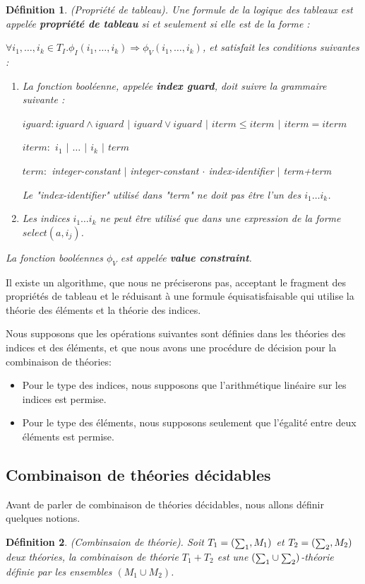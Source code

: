 \documentclass[11pt,openany]{article}
\newcommand\smallsum{\mathsmaller\sum}
\newtheorem{definition}{D\'efinition}[subsection]
\begin{document}
	\begin{definition}
		(Propri\'et\'e de tableau). Une formule de la logique des tableaux est appel\'ee \textbf{propri\'et\'e de tableau} si et seulement si elle est de la forme :
		
$\forall i_{1},\ldots,i_{k}\in T_{I}.\phi_{I}(i_{1},\ldots,i_{k})\Longrightarrow\phi_{V}(i_{1},\ldots,i_{k})$, et satisfait les conditions suivantes :
\begin{enumerate}
\item La fonction bool\'eenne, appel\'ee \textbf{index guard}, doit suivre la grammaire suivante :

$iguard : iguard\land iguard$ $|$ $iguard\lor iguard$ $|$ $iterm\leq iterm$ $|$ $iterm = iterm$

$iterm :$ $i_{1}$ $|$ $\ldots$ $|$ $i_{k}$ $|$ $term$

$term :$ integer-constant $|$ integer-constant $\cdot$ index-identifier $|$ term+term

Le "index-identifier" utilis\'e dans "term" ne doit pas \^etre l'un des $i_{1}\ldots i_{k}$.
\item Les indices $i_{1}\ldots i_{k}$ ne peut \^etre utilis\'e que dans une expression de la forme $select(a,i_{j})$.
\end{enumerate}

La fonction bool\'eennes $\phi_{V}$ est appel\'ee \textbf{value constraint}.
	\end{definition}
	Il existe un algorithme, que nous ne pr\'eciserons pas, acceptant le fragment des propri\'et\'es de tableau et le r\'eduisant \`a une formule \'equisatisfaisable qui utilise la th\'eorie des \'el\'ements et la th\'eorie des indices.
	
	Nous supposons que les op\'erations suivantes sont d\'efinies dans les th\'eories des indices et des \'el\'ements, et que nous avons une proc\'edure de d\'ecision pour la combinaison de th\'eories: 
	\begin{itemize}
	\item Pour le type des indices, nous supposons que l'arithm\'etique lin\'eaire sur les indices est permise.
	\item Pour le type des \'el\'ements, nous supposons seulement que l'\'egalit\'e entre deux \'el\'ements est permise.
	\end{itemize}

	
 	\subsection{Combinaison de th\'eories d\'ecidables}
 	Avant de parler de combinaison de th\'eories d\'ecidables, nous allons d\'efinir quelques notions.
 	\begin{definition}
 	(Combinsaion de th\'eorie).
 		Soit $T_{1}=(\smallsum_{1},M_{1})$ et $T_{2}=(\smallsum_{2},M_{2})$ deux th\'eories, la combinaison de th\'eorie $T_{1} + T_{2}$ est une $(\smallsum_{1}\cup\smallsum_{2})$-th\'eorie d\'efinie par les ensembles $(M_{1}\cup M_{2})$.
	\end{definition}
	
\end{document}
